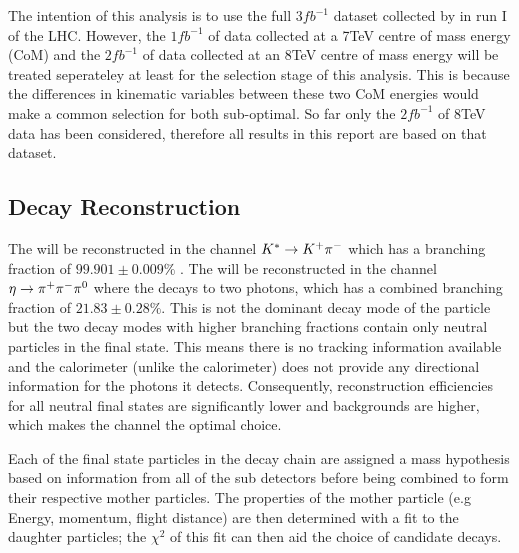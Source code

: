 The intention of this analysis is to use the full $3fb^{-1}$ dataset collected by \lhcb in run I of the LHC.  However, the $1fb^{-1}$ of data collected at a 7TeV centre of mass energy (CoM) and the $2fb^{-1}$ of data collected at an 8TeV centre of mass energy will be treated seperateley at least for the selection stage of this analysis.  This is because the differences in kinematic variables between these two CoM energies would make a common selection for both sub-optimal. So far only the $2fb^{-1}$ of 8TeV data has been considered, therefore all results in this report are based on that dataset.

\subsection{Decay Reconstruction}
\label{sec:Decay Reconstruction}
The \Kstar will be reconstructed in the channel ${{K}^*} \rightarrow {\ensuremath{{K}^+}}{\ensuremath{{\pi}^-}}$ which has a branching fraction of $99.901\pm0.009\%$ \cite{PDG2014}.  The \etaz will be reconstructed in the channel $\eta \rightarrow {\ensuremath{{\pi}^+}}{\ensuremath{{\pi}^-}}{\ensuremath{{\pi}^0}}$ where the \piz decays to two photons, which has a combined branching fraction of $21.83\pm0.28\%$\cite{PDG2014}.  This is not the dominant decay mode of the \etaz particle but the two decay modes with higher branching fractions contain only neutral particles in the final state.  This means there is no tracking information available and the \lhcb calorimeter (unlike the \atlas calorimeter) does not provide any directional information for the photons it detects.  Consequently, reconstruction efficiencies for all neutral final states are significantly lower and backgrounds are higher, which makes the \pip\pim\piz channel the optimal choice.  

Each of the final state particles in the decay chain are assigned a mass hypothesis based on information from all of the \lhcb sub detectors before being combined to form their respective mother particles.  The properties of the mother particle (e.g Energy, momentum, flight distance) are then determined with a fit to the daughter particles;   the $\chi^2$ of this fit can then aid the choice of candidate decays.

